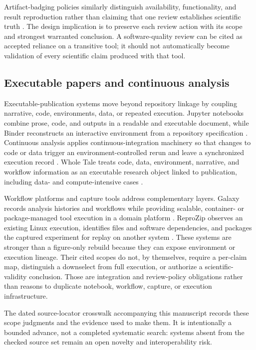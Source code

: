\documentclass[11pt]{article}
\begin{document}
Artifact-badging policies similarly distinguish availability, functionality, and result reproduction rather than claiming that one review establishes scientific truth \citep{acm-artifact-badging-2020}. The design implication is to preserve each review action with its scope and strongest warranted conclusion. A software-quality review can be cited as accepted reliance on a transitive tool; it should not automatically become validation of every scientific claim produced with that tool.

\subsection{Executable papers and continuous analysis}

Executable-publication systems move beyond repository linkage by coupling narrative, code, environments, data, or repeated execution. Jupyter notebooks combine prose, code, and outputs in a readable and executable document, while Binder reconstructs an interactive environment from a repository specification \citep{kluyver-jupyter-2016}. Continuous analysis applies continuous-integration machinery so that changes to code or data trigger an environment-controlled rerun and leave a synchronized execution record \citep{beaulieu-jones-continuous-2017}. Whole Tale treats code, data, environment, narrative, and workflow information as an executable research object linked to publication, including data- and compute-intensive cases \citep{brinckman-whole-tale-2019}.

Workflow platforms and capture tools address complementary layers. Galaxy records analysis histories and workflows while providing scalable, container- or package-managed tool execution in a domain platform \citep{afgan-galaxy-2018}. ReproZip observes an existing Linux execution, identifies files and software dependencies, and packages the captured experiment for replay on another system \citep{chirigati-reprozip-2016}. These systems are stronger than a figure-only rebuild because they can expose environment or execution lineage. Their cited scopes do not, by themselves, require a per-claim map, distinguish a downselect from full execution, or authorize a scientific-validity conclusion. Those are integration and review-policy obligations rather than reasons to duplicate notebook, workflow, capture, or execution infrastructure.

The dated source-locator crosswalk accompanying this manuscript records these scope judgments and the evidence used to make them. It is intentionally a bounded advance, not a completed systematic search: systems absent from the checked source set remain an open novelty and interoperability risk.
\end{document}
